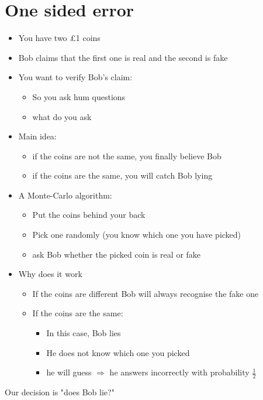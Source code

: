 \documentclass{article}[18pt]
\begin{document}
\section{One sided error}
\begin{itemize}
	\item You have two £1 coins
	\item Bob claims that the first one is real and the second is fake
	\item You want to verify Bob's claim:
	\begin{itemize}
		\item So you ask hum questions
		\item what do you ask
	\end{itemize}
	\item Main idea:
	\begin{itemize}
		\item if the coins are not the same, you finally believe Bob
		\item if the coins are the same, you will catch Bob lying
	\end{itemize}
	\item A Monte-Carlo algorithm:
	\begin{itemize}
		\item Put the coins behind your back
		\item Pick one randomly (you know which one you have picked)
		\item ask Bob whether the picked coin is real or fake
	\end{itemize}
	\item Why does it work
	\begin{itemize}
		\item If the coins are different Bob will always recognise the fake one
		\item If the coins are the same:
		\begin{itemize}
			\item In this case, Bob lies
			\item He does not know which one you picked
			\item he will guess $\Rightarrow$ he answers incorrectly with probability $\frac{1}{2}$
		\end{itemize}
	\end{itemize}
\end{itemize}
Our decision is "does Bob lie?"
\end{document}
